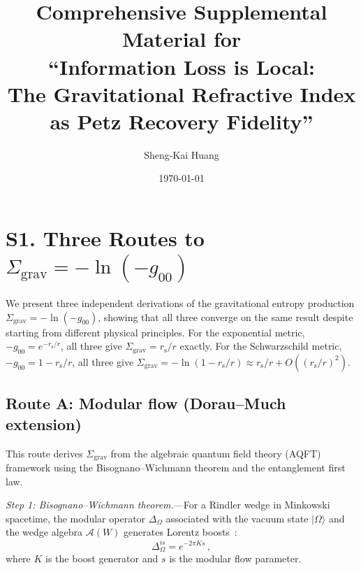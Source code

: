 \documentclass[aps,prd,preprint,superscriptaddress,longbibliography]{revtex4-2}
\newcommand{\ket}[1]{|#1\rangle}
\newcommand{\rs}{r_{\mathrm{s}}}
\newcommand{\Sgrav}{\Sigma_{\mathrm{grav}}}
\begin{document}
\title{Comprehensive Supplemental Material for\\
``Information Loss is Local:\\
The Gravitational Refractive Index as Petz Recovery Fidelity''}

\author{Sheng-Kai Huang}

\date{\today}

\maketitle

\tableofcontents

\section{S1. Three Routes to \texorpdfstring{$\Sgrav = -\ln(-g_{00})$}{Sigma\_grav = -ln(-g00)}}
\label{sec:three_routes}

We present three independent derivations of the gravitational
entropy production $\Sgrav = -\ln(-g_{00})$, showing that all three
converge on the same result despite starting from different physical
principles.  For the exponential metric, $-g_{00} = e^{-\rs/r}$, all
three give $\Sgrav = \rs/r$ exactly.  For the Schwarzschild metric,
$-g_{00} = 1 - \rs/r$, all three give
$\Sgrav = -\ln(1-\rs/r) \approx \rs/r + O((\rs/r)^2)$.

\subsection{Route A: Modular flow (Dorau--Much extension)}
\label{sec:routeA}

This route derives $\Sgrav$ from the algebraic quantum field theory
(AQFT) framework using the Bisognano--Wichmann theorem and the
entanglement first law.

\emph{Step 1: Bisognano--Wichmann theorem.}---For a Rindler wedge in
Minkowski spacetime, the modular operator $\Delta_\Omega$ associated
with the vacuum state $\ket{\Omega}$ and the wedge algebra
$\mathcal{A}(W)$ generates Lorentz boosts~\cite{BisognanoWichmann1976}:
\begin{equation}
  \Delta_\Omega^{is} = e^{-2\pi K s}\,,
  \label{eq:BW}
\end{equation}
where $K$ is the boost generator and $s$ is the modular flow parameter.
\end{document}

